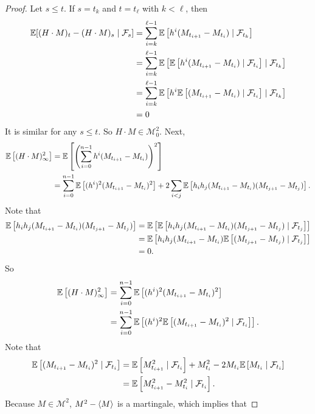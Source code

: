 \begin{proof}
    Let $s \leq t$. If $s = t_k$ and $t = t_\ell$ with $k < \ell$, then
    \begin{align*}
        \mathbb{E}[(H\cdot M)_t - (H \cdot M)_s \mid \mathcal{F}_s] &= \sum_{i=k}^{\ell - 1}\mathbb{E}\left[h^i(M_{t_{i+1}} - M_{t_i}) \mid \mathcal{F}_{t_k}\right] \\
        &=\sum_{i=k}^{\ell - 1}\mathbb{E}\left[\mathbb{E}\left[h^i(M_{t_{i+1}} - M_{t_i}) \mid \mathcal{F}_{t_i}\right] \mid \mathcal{F}_{t_k}\right] \\
        &= \sum_{i=k}^{\ell - 1}\mathbb{E}\left[h^i\mathbb{E}\left[(M_{t_{i+1}} - M_{t_i}) \mid \mathcal{F}_{t_i}\right] \mid \mathcal{F}_{t_k}\right] \\
        &= 0
    \end{align*}
    It is similar for any $s \leq t$. So $H \cdot M \in \mathcal{M}^2_0$. Next,
    \begin{align*}
        \mathbb{E}\left[(H \cdot M)^2_\infty\right] &=  \mathbb{E}\left[\left(\sum_{i=0}^{n-1} h^i(M_{t_{i+1}} - M_{t_i})\right)^2\right] \\
        &= \sum_{i=0}^{n-1}\mathbb{E}\left[(h^i)^2(M_{t_{i+1}} - M_{t_i})^2\right] + 2\sum_{i < j}\mathbb{E}\left[h_ih_j(M_{t_{i+1}} - M_{t_i})(M_{t_{j+1}} - M_{t_j})\right].
    \end{align*}
    Note that
    \begin{align*}
        \mathbb{E}\left[h_ih_j(M_{t_{i+1}} - M_{t_i})(M_{t_{j+1}} - M_{t_j})\right] &= \mathbb{E} \left[\mathbb{E}\left[h_ih_j(M_{t_{i+1}} - M_{t_i})(M_{t_{j+1}} - M_{t_j}) \mid \mathcal{F}_{t_j} \right]\right] \\
        &= \mathbb{E} \left[h_ih_j(M_{t_{i+1}} - M_{t_i})\mathbb{E}\left[(M_{t_{j+1}} - M_{t_j}) \mid \mathcal{F}_{t_j} \right]\right] \\
        &= 0.
    \end{align*}
    So
    \begin{align*}
        \mathbb{E}\left[(H \cdot M)^2_\infty\right] &= \sum_{i=0}^{n-1}\mathbb{E}\left[(h^i)^2(M_{t_{i+1}} - M_{t_i})^2\right] \\
        &= \sum_{i=0}^{n-1} \mathbb{E}\left[(h^i)^2 \mathbb{E}\left[(M_{t_{i+1}} - M_{t_i})^2 \mid \mathcal{F}_{t_i} \right] \right].
    \end{align*}
    Note that
    \begin{align*}
        \mathbb{E}\left[(M_{t_{i+1}} - M_{t_i})^2 \mid \mathcal{F}_{t_i} \right] &= \mathbb{E}\left[M_{t_{i+1}}^2 \mid \mathcal{F}_{t_i}\right] + M_{t_i}^2 - 2 M_{t_i}\mathbb{E}\left[M_{t_i} \mid \mathcal{F}_{t_i}\right]\\
        &= \mathbb{E}\left[M_{t_{i+1}}^2 - M_{t_i}^2 \mid \mathcal{F}_{t_i}\right].
    \end{align*}
    Because $M \in \mathcal{M}^2$, $M^2 - \left\langle M \right\rangle$ is a martingale, which implies that

\end{proof}
